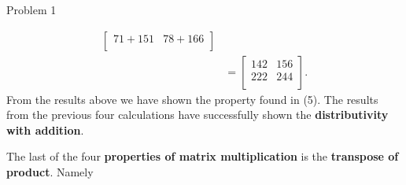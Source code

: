 \begin{problem}{Problem 1}
\begin{Highlight}[Solution]
\begin{align*}
\begin{bmatrix}
                71 + 151 & 78 + 166 \\
            \end{bmatrix} \\
            & = 
            \begin{bmatrix}
                142 & 156 \\
                222 & 244 \\
            \end{bmatrix}.
        \end{align*}
        From the results above we have shown the property found in (5). The results from the previous four calculations have successfully shown the \textbf{distributivity with addition}.

        The last of the four \textbf{properties of matrix multiplication} is the \textbf{transpose of product}. Namely


\end{Highlight}
\end{problem}
